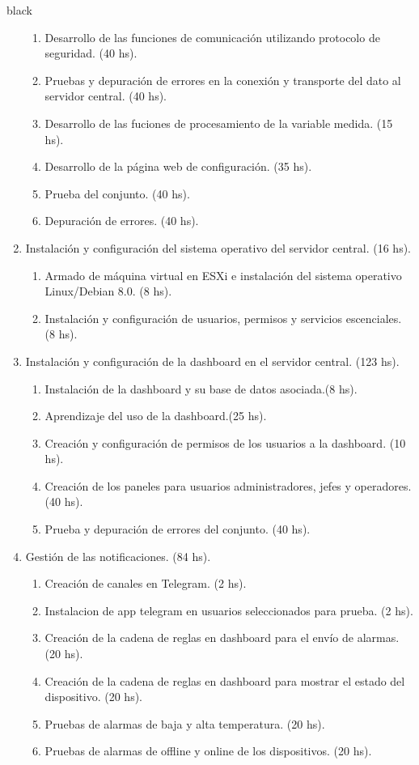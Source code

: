 \documentclass[11pt]{charter}
\begin{document}
\begin{consigna}{black}
\begin{enumerate}
\begin{enumerate}
	\item Desarrollo de las funciones de comunicación utilizando protocolo de seguridad. (40 hs).
	\item Pruebas y depuración de errores en la conexión y transporte del dato al servidor central. (40 hs).
	\item Desarrollo de las fuciones de procesamiento de la variable medida. (15 hs).
	\item Desarrollo de la página web de configuración. (35 hs).
	\item Prueba del conjunto. (40 hs).
	\item Depuración de errores. (40 hs).
	\end{enumerate}
\item Instalación y configuración del sistema operativo del servidor central. (16 hs).
	\begin{enumerate}
	\item Armado de máquina virtual en ESXi e instalación del sistema operativo Linux/Debian 8.0.  (8 hs).
	\item Instalación y configuración de usuarios, permisos y servicios escenciales.  (8 hs).
	\end{enumerate}	
	
\item Instalación y configuración de la dashboard en el servidor central.  (123 hs).
	\begin{enumerate}
	\item Instalación de la dashboard y su base de datos asociada.(8 hs).
	\item Aprendizaje del uso de la dashboard.(25 hs).
	\item Creación y configuración de permisos de los usuarios a la dashboard. (10 hs).
	\item Creación de los paneles para usuarios administradores, jefes y operadores. (40 hs).
	\item Prueba y depuración de errores del conjunto. (40 hs).
	\end{enumerate}		
	
\item Gestión de las notificaciones. (84 hs).
	\begin{enumerate}
	\item Creación de canales en Telegram. (2 hs).
	\item Instalacion de app telegram en usuarios seleccionados para prueba. (2 hs).
	\item Creación de la cadena de reglas en dashboard para el envío de alarmas. (20 hs).
	\item Creación de la cadena de reglas en dashboard para mostrar el estado del dispositivo. (20 hs).
	\item Pruebas de alarmas de baja y alta temperatura. (20 hs).
	\item Pruebas de alarmas de offline y online de los dispositivos. (20 hs).
	\end{enumerate}		


\end{enumerate}
\end{consigna}
\end{document}
